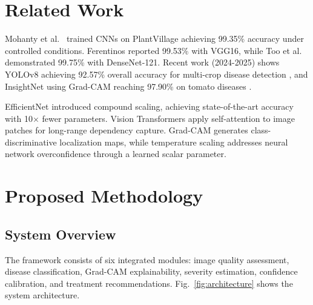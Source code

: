 \documentclass[conference]{IEEEtran}
\begin{document}
\section{Related Work}

Mohanty et al.\ \cite{mohanty2016} trained CNNs on PlantVillage achieving 99.35\% accuracy under controlled conditions. Ferentinos \cite{ferentinos2018} reported 99.53\% with VGG16, while Too et al.\ \cite{too2019} demonstrated 99.75\% with DenseNet-121. Recent work (2024-2025) shows YOLOv8 achieving 92.57\% overall accuracy for multi-crop disease detection \cite{pmc2024}, and InsightNet using Grad-CAM reaching 97.90\% on tomato diseases \cite{insightnet2024}.

EfficientNet \cite{tan2019} introduced compound scaling, achieving state-of-the-art accuracy with 10$\times$ fewer parameters. Vision Transformers \cite{dosovitskiy2021} apply self-attention to image patches for long-range dependency capture. Grad-CAM \cite{selvaraju2017} generates class-discriminative localization maps, while temperature scaling \cite{guo2017} addresses neural network overconfidence through a learned scalar parameter.

\section{Proposed Methodology}

\subsection{System Overview}

The framework consists of six integrated modules: image quality assessment, disease classification, Grad-CAM explainability, severity estimation, confidence calibration, and treatment recommendations. Fig.~\ref{fig:architecture} shows the system architecture.
\end{document}
